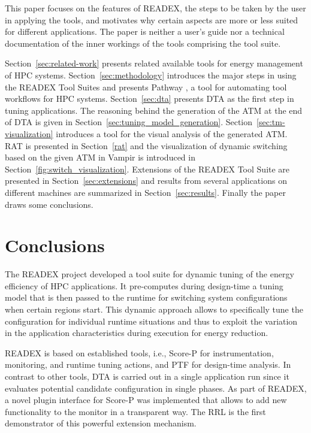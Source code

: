 \documentclass[runningheads]{llncs}
\begin{document}
This paper focuses on the features of READEX, the steps to be taken by the user in applying the tools, and motivates why certain aspects are more or less suited for different applications. The paper is neither a user's guide nor a technical documentation of the inner workings of the tools comprising the tool suite. 

Section~\ref{sec:related-work} presents related available tools for energy management of HPC systems. Section~\ref{sec:methodology} introduces the major steps in using the READEX Tool Suites and presents Pathway \cite{Pathway:Petkov13}, a tool for automating tool workflows for HPC systems. Section~\ref{sec:dta} presents DTA as the first step in tuning applications. The reasoning behind the generation of the ATM at the end of DTA is given in Section~\ref{sec:tuning_model_generation}. Section~\ref{sec:tm-visualization} introduces a tool for the visual analysis of the generated ATM. RAT is presented in Section~\ref{rat} and the visualization of dynamic switching based on the given ATM in Vampir is introduced in Section~\ref{fig:switch_visualization}. Extensions of the READEX Tool Suite are presented in Section~\ref{sec:extensions} and results from several applications on different machines are summarized in Section~\ref{sec:results}. Finally the paper draws some conclusions. 


















\section{Conclusions} \label{sec:conclusions}

The READEX project developed a tool suite for dynamic tuning of the energy efficiency of HPC applications. It pre-computes during design-time a tuning model that is then passed to the runtime for switching system configurations when certain regions start. This dynamic approach allows to specifically tune the configuration for individual runtime situations and thus to exploit the variation in the application characteristics during execution for energy reduction. 

READEX is based on established tools, i.e., Score-P for instrumentation, monitoring, and runtime tuning actions, and PTF for design-time analysis. In contrast to other tools, DTA is carried out in a single application run since it evaluates potential candidate configuration in single phases. As part of READEX, a novel plugin interface for Score-P was implemented that allows to add new functionality to the monitor in a transparent way. The RRL is the first demonstrator of this powerful extension mechanism.
\end{document}
